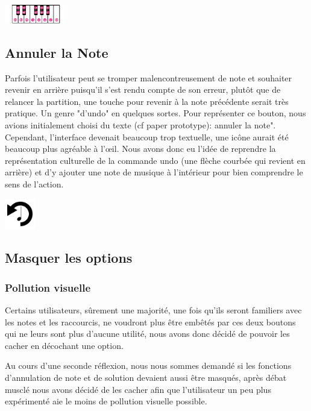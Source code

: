 \documentclass{article}
\begin{document}
\begin{center}
\includegraphics[width = 100px]{./images/doremi2.png}
\end{center}

\subsection{Annuler la Note}
Parfois l'utilisateur peut se tromper malencontreusement de note et souhaiter revenir en arrière puisqu'il s'est rendu compte de son erreur,
plutôt que de relancer la partition, une touche pour revenir à la note précédente serait très pratique. Un genre "d'undo" en quelques sortes.
Pour représenter ce bouton, nous avions initialement choisi du texte (cf paper prototype): annuler la note". Cependant, l'interface devenait beaucoup
trop textuelle, une icône aurait été beaucoup plus agréable à l’œil. Nous avons donc eu l'idée de reprendre la représentation culturelle de la commande
undo (une flèche courbée qui revient en arrière) et d'y ajouter une note de musique à l'intérieur pour bien comprendre le sens de l'action.

\begin{center}
\includegraphics[width = 50px]{./images/undo.png}
\end{center}
\subsection{Masquer les options}
\subsubsection{Pollution visuelle}
Certains utilisateurs, sûrement une majorité, une fois qu'ils seront familiers avec les notes et les raccourcis, ne voudront plus 
être embêtés par ces deux boutons qui ne leurs sont plus d'aucune utilité, nous avons donc décidé de pouvoir les cacher en décochant
une option.


Au cours d'une seconde réflexion, nous nous sommes demandé si les fonctions d'annulation de note et de solution devaient aussi 
être masqués, après débat musclé nous avons décidé de les cacher afin que l'utilisateur un peu plus expérimenté aie le moins de 
pollution  visuelle possible.
\end{document}
